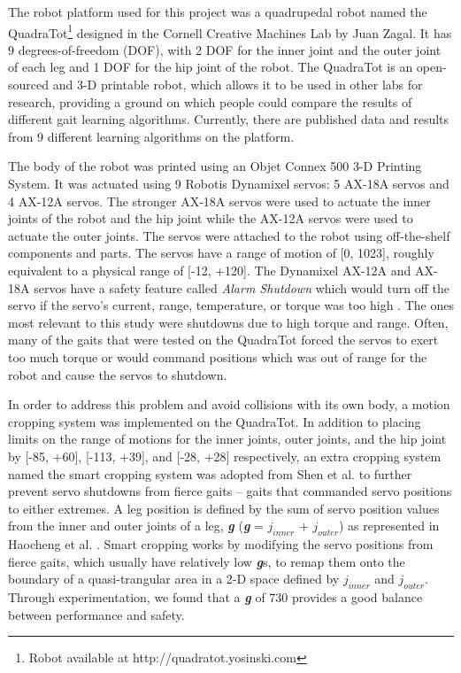 The robot platform used for this project was a quadrupedal robot named the QuadraTot\footnote{Robot available at http://quadratot.yosinski.com} designed in the Cornell Creative Machines Lab by Juan Zagal.
It has 9 degrees-of-freedom (DOF), with 2 DOF for the inner joint and the outer joint of each leg and 1 DOF for the hip joint of the robot. 
The QuadraTot is an open-sourced and 3-D printable robot, which allows it to be used in other labs for research, providing a ground on which people could compare the results of different gait learning algorithms. 
Currently, there are published data and results from 9 different learning algorithms on the platform. 


The body of the robot was printed using an Objet Connex 500 3-D Printing System. 
It was actuated using 9 Robotis Dynamixel servos: 5 AX-18A servos and 4 AX-12A servos. 
The stronger AX-18A servos were used to actuate the inner joints of the robot and the hip joint while the AX-12A servos were used to actuate the outer joints. 
The servos were attached to the robot using off-the-shelf components and parts.
The servos have a range of motion of [0, 1023], roughly equivalent to a physical range of [-12\degree, +120\degree]. 
The Dynamixel AX-12A and AX-18A servos have a safety feature called \emph{Alarm Shutdown} which would turn off the servo if the servo's current, range, temperature, or torque was too high \cite{robotis}. 
The ones most relevant to this study were shutdowns due to high torque and range. 
Often, many of the gaits that were tested on the QuadraTot forced the servos to exert too much torque or would command positions which was out of range for the robot \cite{yos:clune} and cause the servos to shutdown. 


In order to address this problem and avoid collisions with its own body, a motion cropping system was implemented on the QuadraTot. 
In addition to placing limits on the range of motions for the inner joints, outer joints, and the hip joint by [-85\degree, +60\degree], [-113\degree, +39\degree], and [-28\degree, +28\degree] respectively, an extra cropping system named the smart cropping system was adopted from Shen et al. \cite{haocheng} to further prevent servo shutdowns from fierce gaits -- gaits that commanded servo positions to either extremes. 
A leg position is defined by the sum of servo position values from the inner and outer joints of a leg, \emph{\textbf{g}} (\emph{\textbf{g}} = $j_{inner}$ + $j_{outer}$) as represented in Haocheng et al. \cite{haocheng}.
Smart cropping works by modifying the servo positions from fierce gaits, which usually have relatively low \emph{\textbf{g}}s, to remap them onto the boundary of a quasi-trangular area in a 2-D space defined by $j_{inner}$ and $j_{outer}$.
Through experimentation, we found that a \emph{\textbf{g}} of 730 provides a good balance between performance and safety. 


